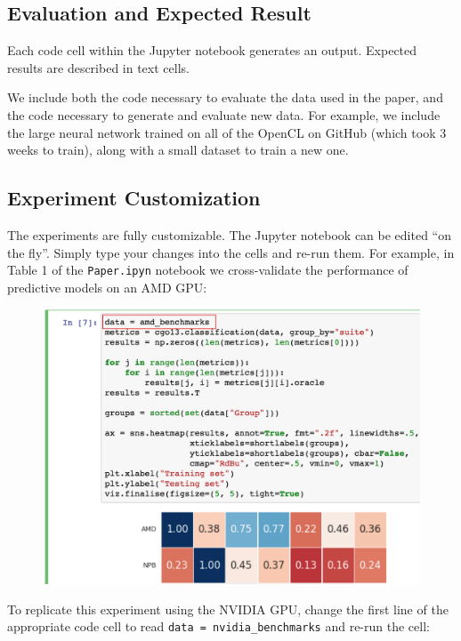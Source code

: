 \subsection{Evaluation and Expected Result}

Each code cell within the Jupyter notebook generates an output. Expected results are described in text cells.

We include both the code necessary to evaluate the data used in the paper, and the code necessary to generate and evaluate new data. For example, we include the large neural network trained on all of the OpenCL on GitHub (which took 3 weeks to train), along with a small dataset to train a new one.

\newpage
\subsection{Experiment Customization}

The experiments are fully customizable. The Jupyter notebook can be edited ``on the fly''. Simply type your changes into the cells and re-run them. For example, in Table 1 of the \texttt{Paper.ipyn} notebook we cross-validate the performance of predictive models on an AMD GPU:

\begin{figure}[H]
\includegraphics[width=\columnwidth]{img/example-1}
\end{figure}

\noindent
To replicate this experiment using the NVIDIA GPU, change the first line of the appropriate code cell to read \texttt{data = nvidia\_benchmarks} and re-run the cell:

